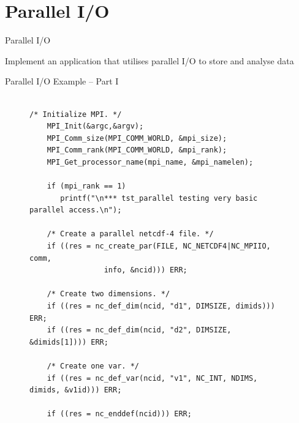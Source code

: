 \documentclass[compress,11pt,xcolor=svgnames,aspectratio=169]{beamer}
\begin{document}

\section{Parallel I/O}

\begin{frame}[fragile]{Parallel I/O}

Implement an application that utilises parallel I/O to store and analyse data

\end{frame}

\begin{frame}[fragile]{Parallel I/O Example -- Part I}

\begin{figure}
\centering
\begin{varwidth}{\linewidth}
{ \tiny

\begin{verbatim}

/* Initialize MPI. */
    MPI_Init(&argc,&argv);
    MPI_Comm_size(MPI_COMM_WORLD, &mpi_size);
    MPI_Comm_rank(MPI_COMM_WORLD, &mpi_rank);
    MPI_Get_processor_name(mpi_name, &mpi_namelen);

    if (mpi_rank == 1)
       printf("\n*** tst_parallel testing very basic parallel access.\n");

    /* Create a parallel netcdf-4 file. */
    if ((res = nc_create_par(FILE, NC_NETCDF4|NC_MPIIO, comm,
			     info, &ncid))) ERR;

    /* Create two dimensions. */
    if ((res = nc_def_dim(ncid, "d1", DIMSIZE, dimids))) ERR;
    if ((res = nc_def_dim(ncid, "d2", DIMSIZE, &dimids[1]))) ERR;

    /* Create one var. */
    if ((res = nc_def_var(ncid, "v1", NC_INT, NDIMS, dimids, &v1id))) ERR;

    if ((res = nc_enddef(ncid))) ERR;

\end{verbatim}

}
\end{varwidth}
\end{figure}

\end{frame}
\end{document}
